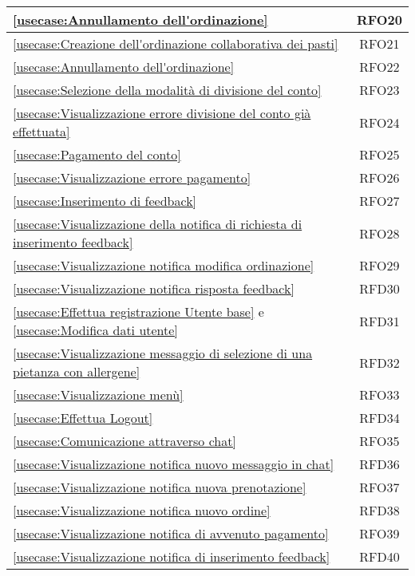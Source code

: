 \begin{longtable}{|l|c|}
    \hline
    \autoref{usecase:Annullamento dell'ordinazione} & RFO20 \\
    \hline
    \autoref{usecase:Creazione dell'ordinazione collaborativa dei pasti} & RFO21 \\
    \hline
    \autoref{usecase:Annullamento dell'ordinazione} & RFO22 \\
    \hline
    \autoref{usecase:Selezione della modalità di divisione del conto} & RFO23 \\
    \hline
    \autoref{usecase:Visualizzazione errore divisione del conto già effettuata} & RFO24 \\
    \hline
    \autoref{usecase:Pagamento del conto} & RFO25 \\
    \hline
    \autoref{usecase:Visualizzazione errore pagamento} & RFO26 \\
    \hline
    \autoref{usecase:Inserimento di feedback} & RFO27 \\
    \hline
    \autoref{usecase:Visualizzazione della notifica di richiesta di inserimento feedback} & RFO28 \\
    \hline
    \autoref{usecase:Visualizzazione notifica modifica ordinazione} & RFO29 \\
    \hline
    \autoref{usecase:Visualizzazione notifica risposta feedback} & RFD30 \\
    \hline
    \autoref{usecase:Effettua registrazione Utente base} e \autoref{usecase:Modifica dati utente} & RFD31 \\
    \hline
    \autoref{usecase:Visualizzazione messaggio di selezione di una pietanza con allergene} & RFD32 \\
    \hline
    \autoref{usecase:Visualizzazione menù} & RFO33 \\
    \hline
    \autoref{usecase:Effettua Logout} & RFD34 \\
    \hline
    \autoref{usecase:Comunicazione attraverso chat} & RFO35 \\
    \hline
    \autoref{usecase:Visualizzazione notifica nuovo messaggio in chat} & RFD36 \\
    \hline
    \autoref{usecase:Visualizzazione notifica nuova prenotazione} & RFO37 \\
    \hline
    \autoref{usecase:Visualizzazione notifica nuovo ordine} & RFD38 \\
    \hline
    \autoref{usecase:Visualizzazione notifica di avvenuto pagamento} & RFO39 \\
    \hline
    \autoref{usecase:Visualizzazione notifica di inserimento feedback} & RFD40 \\

\end{longtable}
